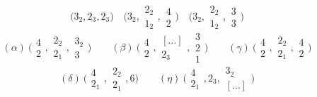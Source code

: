 \documentclass[11pt,a4paper]{article}
\begin{document}
\[
  \bigl(3_2, 2_3, 2_3\bigr) \quad
  \bigl(3_2, \begin{smallmatrix}2_2\\1_2\end{smallmatrix}, \begin{smallmatrix}4\\2\end{smallmatrix}\bigr) \quad
  \bigl(3_2, \begin{smallmatrix}2_2\\1_2\end{smallmatrix}, \begin{smallmatrix}3\\3\end{smallmatrix}\bigr)
\]
\[
  (\alpha)\ \bigl(\begin{smallmatrix}4\\2\end{smallmatrix}, \begin{smallmatrix}2_2\\2_1\end{smallmatrix}, \begin{smallmatrix}3_2\\3\end{smallmatrix}\bigr) \qquad
  (\beta)\ \bigl(\begin{smallmatrix}4\\2\end{smallmatrix}, \begin{smallmatrix}[\ldots]\\2_3\end{smallmatrix}, \begin{smallmatrix}3\\2\\1\end{smallmatrix}\bigr) \qquad
  (\gamma)\ \bigl(\begin{smallmatrix}4\\2\end{smallmatrix}, \begin{smallmatrix}2_2\\2_1\end{smallmatrix}, \begin{smallmatrix}4\\2\end{smallmatrix}\bigr)
\]
\[
  (\delta)\ \bigl(\begin{smallmatrix}4\\2_1\end{smallmatrix}, \begin{smallmatrix}2_2\\2_1\end{smallmatrix}, 6\bigr) \qquad
  (\eta)\ \bigl(\begin{smallmatrix}4\\2_1\end{smallmatrix}, 2_3, \begin{smallmatrix}3_2\\ {[\ldots]}\end{smallmatrix}\bigr)
\]
\end{document}
